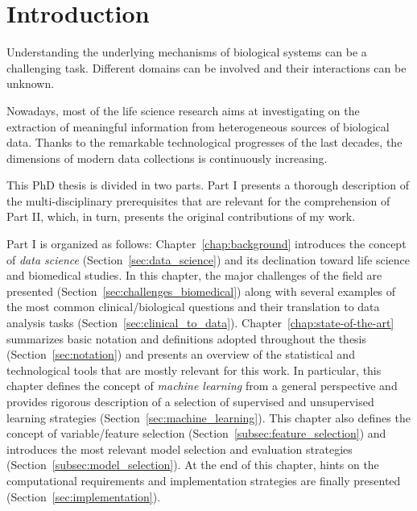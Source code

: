 
\chapter{Introduction} \label{chapter:introduction}
Understanding the underlying mechanisms of biological systems can be a challenging task. Different domains can be involved and their interactions can be unknown.

Nowadays, most of the life science research aims at investigating on the extraction of meaningful information from heterogeneous sources of biological data. Thanks to the remarkable technological progresses of the last decades, the dimensions of modern data collections is continuously increasing.

This PhD thesis is divided in two parts. Part I presents a thorough description of the multi-disciplinary prerequisites that are relevant for the comprehension of Part II, which, in turn, presents the original contributions of my work.

Part I is organized as follows: Chapter~\ref{chap:background} introduces the concept of \textit{data science} (Section~\ref{sec:data_science}) and its declination toward life science and biomedical studies. In this chapter, the major challenges of the field are presented (Section~\ref{sec:challenges_biomedical}) along with several examples of the most common clinical/biological questions and their translation to data analysis tasks (Section~\ref{sec:clinical_to_data}).
Chapter~\ref{chap:state-of-the-art} summarizes basic notation and definitions adopted throughout the thesis (Section~\ref{sec:notation}) and presents an overview of the statistical and technological tools that are mostly relevant for this work. In particular, this chapter defines the concept of \textit{machine learning} from a general perspective and provides rigorous description of a selection of supervised and unsupervised learning strategies (Section~\ref{sec:machine_learning}).
This chapter also defines the concept of variable/feature selection (Section~\ref{subsec:feature_selection}) and introduces the most relevant model selection and evaluation strategies (Section~\ref{subsec:model_selection}).
At the end of this chapter, hints on the computational requirements and implementation strategies are finally presented (Section~\ref{sec:implementation}).

